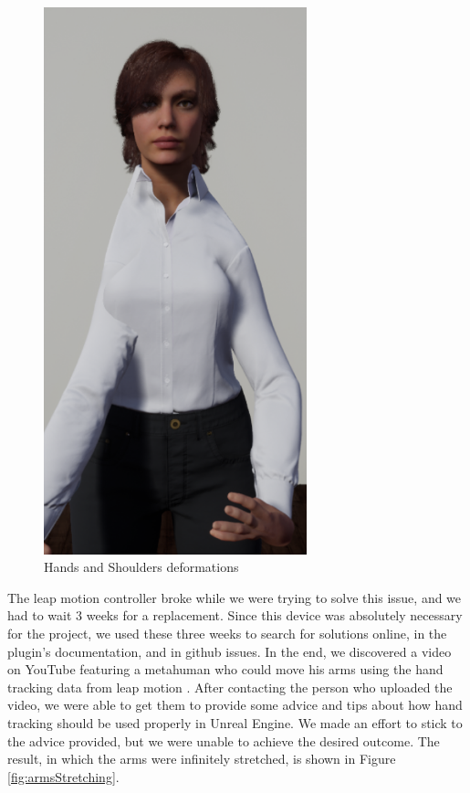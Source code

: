\begin{table}[!htb]
\begin{minipage}{\linewidth}
\begin{subfigure}{0.49\textwidth}
            \includegraphics[width=0.68\textwidth]{figures/FirstInteraction.png}
            \centering
            \caption{Hands and Shoulders deformations}
        \end{subfigure}
        \label{fig:initialSteps}
	\end{minipage}
\end{table}

The leap motion controller broke while we were trying to solve this issue, and we had to wait 3 weeks for a replacement. Since this device was absolutely necessary for the project, we used these three weeks to search for solutions online, in the plugin's documentation, and in github issues. In the end, we discovered a video on YouTube featuring a metahuman who could move his arms using the hand tracking data from leap motion \cite{TVL}. After contacting the person who uploaded the video, we were able to get them to provide some advice and tips about how hand tracking should be used properly in Unreal Engine. We made an effort to stick to the advice provided, but we were unable to achieve the desired outcome. The result, in which the arms were infinitely stretched, is shown in Figure \ref{fig:armsStretching}.

